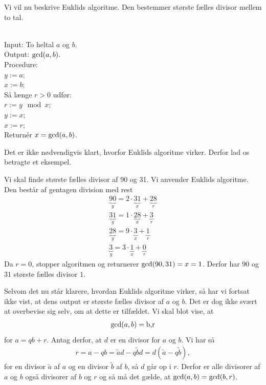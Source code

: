 \documentclass[12pt]{article}
\begin{document}
Vi vil nu beskrive Euklids algoritme. Den bestemmer største fælles divisor mellem to tal. 
\begin{defn}\phantom{h} \\
Input: To heltal $a$ og $b$.\\
Output: $\textnormal{gcd}(a,b)$.\\
Procedure:\\
$y := a$;\\
$x := b$;\\
Så længe $r>0$ udfør:\\
\phantom{hhhhhhhhh} $r := y \mod{x}$;\\
\phantom{hhhhhhhhh} $y := x$;\\
\phantom{hhhhhhhhh} $x := r;$\\
Returnér $x = \textnormal{gcd}(a,b)$.
\end{defn}
Det er ikke nødvendigvis klart, hvorfor Euklids algoritme virker. Derfor lad os betragte et eksempel. 
\begin{exa}\label{exa:euklid}
Vi skal finde største fælles divisor af 90 og 31. Vi anvender Euklids algoritme. Den består af gentagen division med rest
\begin{align*}
\underbrace{90}_{y} = 2 \cdot \underbrace{31}_{x} + \underbrace{28}_{r} \\
\underbrace{31}_{y} = 1 \cdot \underbrace{28}_{x} + \underbrace{3}_{r} \\
\underbrace{28}_{y} = 9 \cdot \underbrace{3}_{x} + \underbrace{1}_{r} \\
\underbrace{3}_{y} = 3 \cdot \underbrace{1}_{x} + \underbrace{0}_{r} 
\end{align*}
Da $r=0$, stopper algoritmen og returnerer $\textnormal{gcd}(90,31) = x = 1$. Derfor har $90$ og $31$ største fælles divisor $1$. 
\end{exa}
Selvom det nu står klarere, hvordan Euklids algoritme virker, så har vi fortsat ikke vist, at dens output er største fælles divisor af $a$ og $b$. Det er dog ikke svært at overbevise sig selv, om at dette er tilfældet. Vi skal blot vise, at 
\begin{align*}
\textnormal{gcd}(a,b) = \textnormal{b,r}
\end{align*}
for $a = qb + r$. Antag derfor, at $d$ er en divisor for $a$ og $b$. Vi har så
\begin{align*}
r = a-qb = \tilde{a}d - q\tilde{b}d = d(\tilde{a}-q\tilde{b}),
\end{align*}
for en divisor $\tilde{a}$ af $a$ og en divisor $\tilde{b}$ af $b$, så $d$ går op i $r$. Derfor er alle divisorer af $a$ og $b$ også divisorer af $b$ og $r$ og så må det gælde, at $\textnormal{gcd}(a,b)=\textnormal{gcd}(b,r)$.
\end{document}
